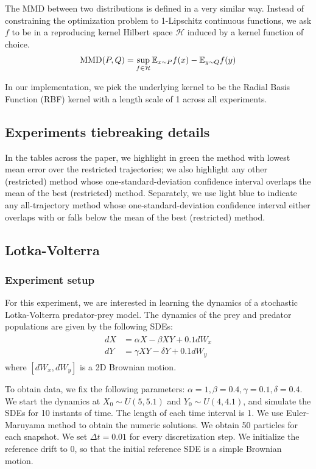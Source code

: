 The MMD between two distributions is defined in a very similar way. Instead of constraining the optimization problem to 1-Lipschitz continuous functions, we ask $f$ to be in a reproducing kernel Hilbert space $\mathcal{H}$ induced by a kernel function of choice.
\begin{equation}
    \mathrm{MMD}(P,Q) = \sup_{f\in\mathcal{H}} \mathbb{E}_{x\sim P}f(x)-\mathbb{E}_{y\sim Q}f(y)
\end{equation}

In our implementation, we pick the underlying kernel to be the Radial Basis Function (RBF) kernel with a length scale of 1 across all experiments. 

\subsection{Experiments tiebreaking details}
\label{app:tiebreaking}
In the tables across the paper, we highlight in green the method with lowest mean error over the restricted trajectories; we also highlight any other (restricted) method whose one-standard-deviation confidence interval overlaps the mean of the best (restricted) method. Separately, we use light blue to indicate any all-trajectory method whose one-standard-deviation confidence interval either overlaps with or falls below the mean of the best (restricted) method. 

\subsection{Lotka-Volterra}
\label{app:lv-app}
\subsubsection{Experiment setup}
For this experiment, we are interested in learning the dynamics of a stochastic Lotka-Volterra predator-prey model. The dynamics of the prey and predator populations are given by the following SDEs:
\begin{align}
\begin{split}
\label{eq:lv-family}
    dX &= \alpha X-\beta XY + 0.1dW_x\\
    dY &= \gamma XY-\delta Y + 0.1dW_y
\end{split}
\end{align}
where $[dW_x,dW_y]$ is a 2D Brownian motion.  

To obtain data, we fix the following parameters: $\alpha=1, \beta = 0.4, \gamma=0.1,\delta=0.4$. We start the dynamics at $X_0\sim U(5,5.1)$ and $Y_0\sim U(4,4.1)$, and simulate the SDEs for 10 instants of time. The length of each time interval is 1. We use Euler-Maruyama method to obtain the numeric solutions. We obtain 50 particles for each snapshot. We set $\Delta t = 0.01$ for every discretization step. We initialize the reference drift to 0, so that the initial reference SDE is a simple Brownian motion. 

